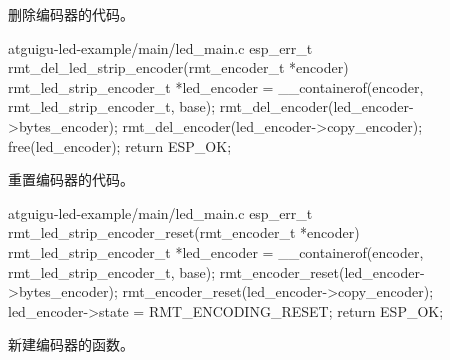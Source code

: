 \documentclass[lang=cn,newtx,10pt,scheme=chinese]{elegantbook}
\begin{document}
删除编码器的代码。

\begin{mycode}{atguigu-led-example/main/led\_main.c}
esp_err_t rmt_del_led_strip_encoder(rmt_encoder_t *encoder)
{
    rmt_led_strip_encoder_t *led_encoder = __containerof(encoder, rmt_led_strip_encoder_t, base);
    rmt_del_encoder(led_encoder->bytes_encoder);
    rmt_del_encoder(led_encoder->copy_encoder);
    free(led_encoder);
    return ESP_OK;
}
\end{mycode}

重置编码器的代码。

\begin{mycode}{atguigu-led-example/main/led\_main.c}
esp_err_t rmt_led_strip_encoder_reset(rmt_encoder_t *encoder)
{
    rmt_led_strip_encoder_t *led_encoder = __containerof(encoder, rmt_led_strip_encoder_t, base);
    rmt_encoder_reset(led_encoder->bytes_encoder);
    rmt_encoder_reset(led_encoder->copy_encoder);
    led_encoder->state = RMT_ENCODING_RESET;
    return ESP_OK;
}
\end{mycode}

新建编码器的函数。
\end{document}
